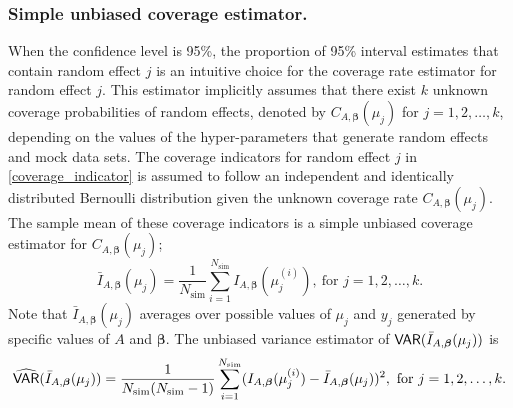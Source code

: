 \documentclass[article]{jss}
\begin{document}




\subsubsection{Simple unbiased coverage estimator.}
When the confidence level is 95\%, the proportion of 95\% interval estimates that contain random effect $j$ is an intuitive choice for  the coverage rate estimator for random effect $j$. This estimator  implicitly assumes that there exist $k$ unknown coverage probabilities of random effects, denoted by $C_{A, \boldsymbol{\beta}}(\mu_j)$ for $j=1, 2, \ldots, k$, depending on the values of the hyper-parameters that generate random effects and mock data sets. The coverage indicators for random effect $j$ in  \eqref{coverage_indicator} is assumed to follow an independent and identically distributed  Bernoulli distribution given the unknown coverage rate $C_{A, \boldsymbol{\beta}}(\mu_j)$. The sample mean of these coverage indicators is a simple unbiased coverage estimator for $C_{A, \boldsymbol{\beta}}(\mu_j)$;  %
\begin{equation}
\bar{I}_{A, \boldsymbol{\beta}}(\mu_j)= \frac{1}{N_{\textrm{sim}}}\sum_{i=1}^{N_{\textrm{sim}}}I_{A, \boldsymbol{\beta}}(\mu_j^{(i)}),~\textrm{for } j=1, 2, \ldots, k.
\end{equation}
Note that $\bar{I}_{A, \boldsymbol{\beta}}(\mu_j)$ averages over possible values of $\mu_{j}$ and $y_{j}$ generated by specific values of $A$ and $\boldsymbol{\beta}$. The unbiased variance estimator of $\mathsf{VAR}(\bar{I}_{A, \boldsymbol{\beta}}(\mu_j))$ is 
\begin{equation}\label{svar}
\widehat{\mathsf{VAR}}(\bar{I}_{A, \boldsymbol{\beta}}(\mu_j))=\frac{1}{N_{\textrm{sim}}(N_{\textrm{sim}}-1)}\sum_{i=1}^{N_{\textrm{sim}}}(I_{A, \boldsymbol{\beta}}(\mu_j^{(i)})-\bar{I}_{A, \boldsymbol{\beta}}(\mu_j))^{2},~\textrm{for } j=1, 2, \ldots, k.
\end{equation}
\end{document}
